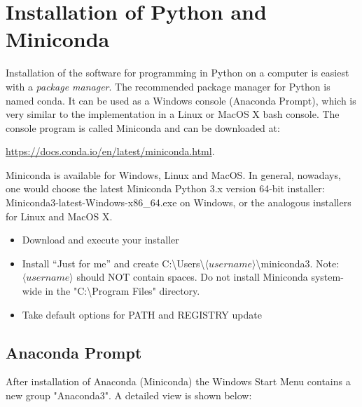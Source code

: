 \section{Installation of Python and Miniconda}
\label{appendix:second}

Installation of the software for programming in Python on a computer is easiest with a \emph{package manager}. The recommended package manager for Python is named \textsf{conda}. It can be used as a Windows console (\textsf{Anaconda Prompt}), which is very similar to the implementation in a Linux or MacOS X \textsf{bash} console. 
The console program is called \textsf{Miniconda} and can be downloaded at:

\url{https://docs.conda.io/en/latest/miniconda.html}. 
 
Miniconda is available for Windows, Linux and MacOS.
In general, nowadays, one would choose the latest Miniconda Python 3.x version 64-bit installer:\textsf{ Miniconda3-latest-Windows-x86\_64.exe} on Windows, or the analogous installers for Linux and MacOS X.

\begin{itemize}
	\item Download and execute your installer
	\item Install “Just for me”	and create C:\textbackslash Users\textbackslash $\langle username\rangle$\textbackslash miniconda3. Note: $\langle username\rangle$ should NOT contain spaces. Do not install Miniconda system-wide in the "C:\textbackslash Program Files" directory.
	\item Take default options for PATH and REGISTRY update
\end{itemize}

\subsection{Anaconda Prompt}
\label{appendix:anaconda}

After installation of Anaconda (Miniconda) the Windows Start Menu contains a new group "Anaconda3". A detailed view is shown below:

